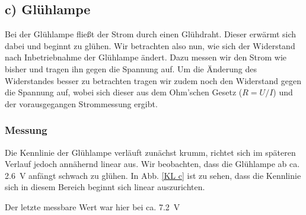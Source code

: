 \documentclass[11pt,a4paper,titlepage, ngerman]{article}
\begin{document}
		\subsection{c) Glühlampe} 
			
			Bei der Glühlampe fließt der Strom durch einen Glühdraht.
			Dieser erwärmt sich dabei und beginnt zu glühen.
			Wir betrachten also nun, wie sich der Widerstand nach Inbetriebnahme der Glühlampe ändert.
			Dazu messen wir den Strom wie bisher und tragen ihn gegen die Spannung auf.
			Um die Änderung des Widerstandes besser zu betrachten tragen wir zudem noch den Widerstand gegen die Spannung auf, wobei sich dieser aus dem Ohm'schen Gesetz ($R = U / I$) und der vorausgegangen Strommessung ergibt.  
			
			\subsubsection*{Messung}
				
				Die Kennlinie der Glühlampe verläuft zunächst krumm, richtet sich im späteren Verlauf jedoch annähernd linear aus. Wir beobachten, dass die Glühlampe ab ca. \SI{2.6}{\V} anfängt schwach zu glühen. In Abb. \ref{KL c} ist zu sehen, dass die Kennlinie sich in diesem Bereich beginnt sich linear auszurichten.
				
				
				Der letzte messbare Wert war hier bei ca. \SI{7.2}{\V}
				
\end{document}
